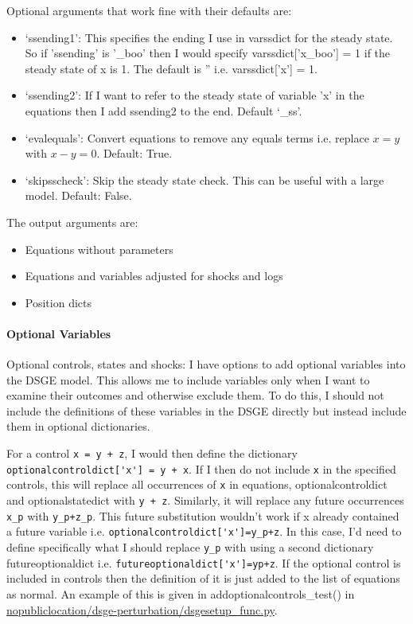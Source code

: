\documentclass{article}
\theoremstyle{definition}
\begin{document}
Optional arguments that work fine with their defaults are:
\begin{itemize}
    \item `ssending1': This specifies the ending I use in varssdict for the steady state. So if 'ssending' is '\_boo' then I would specify varssdict['x\_boo'] = 1 if the steady state of x is 1. The default is '' i.e. varssdict['x'] = 1.
    \item `ssending2': If I want to refer to the steady state of variable 'x' in the equations then I add ssending2 to the end. Default `\_ss'.
    \item `evalequals': Convert equations to remove any equals terms i.e. replace $x = y$ with $x - y = 0$. Default: True.
    \item `skipsscheck': Skip the steady state check. This can be useful with a large model. Default: False.
\end{itemize}

The output arguments are:
\begin{itemize}
    \item Equations without parameters
    \item Equations and variables adjusted for shocks and logs
    \item Position dicts
\end{itemize}

\paragraph{Optional Variables}
Optional controls, states and shocks: I have options to add optional variables into the DSGE model. This allows me to include variables only when I want to examine their outcomes and otherwise exclude them. To do this, I should not include the definitions of these variables in the DSGE directly but instead include them in optional dictionaries.

For a control \verb|x = y + z|, I would then define the dictionary \verb|optionalcontroldict['x'] = y + x|. If I then do not include \verb|x| in the specified controls, this will replace all occurrences of \verb|x| in equations, optionalcontroldict and optionalstatedict with \verb|y + z|. Similarly, it will replace any future occurrences \verb|x_p| with \verb|y_p+z_p|. This future substitution wouldn't work if x already contained a future variable i.e. \verb|optionalcontroldict['x']=y_p+z|. In this case, I'd need to define specifically what I should replace \verb|y_p| with using a second dictionary futureoptionaldict i.e. \verb|futureoptionaldict['x']=yp+z|. If the optional control is included in controls then the definition of it is just added to the list of equations as normal. An example of this is given in addoptionalcontrols\_test() in \url{nopubliclocation/dsge-perturbation/dsgesetup_func.py}.
\end{document}
